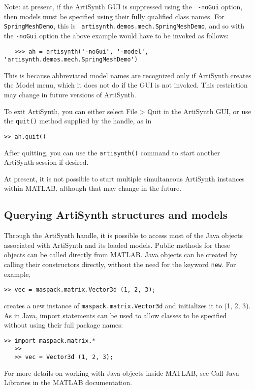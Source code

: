 \documentclass{article}
\begin{document}
%
\begin{sideblock}
Note: at present, if the ArtiSynth GUI is suppressed using the {\tt
-noGui} option, then models must be specified using their fully
qualified class names. For {\tt SpringMeshDemo}, this is {\tt
artisynth.demos.mech.SpringMeshDemo}, and so with the {\tt -noGui}
option the above example would have to be invoked as follows:
%
\begin{verbatim}
   >>> ah = artisynth('-noGui', '-model', 'artisynth.demos.mech.SpringMeshDemo')
\end{verbatim}
%
This is because abbreviated model names are recognized only if
ArtiSynth creates the {\sf Model} menu, which it does not do if the
GUI is not invoked. This restriction may change in future versions of
ArtiSynth.
\end{sideblock}
%

To exit ArtiSynth, you can either select {\sf File > Quit} in the
ArtiSynth GUI, or use the {\tt quit()} method supplied by the handle,
as in
%
\begin{lstlisting}[]
  >> ah.quit()
\end{lstlisting}
%

After quitting, you can use the {\tt artisynth()} command to start
another ArtiSynth session if desired.

\begin{sideblock}
At present, it is not possible to start multiple simultaneous
ArtiSynth instances within MATLAB, although that may change in the
future.
\end{sideblock}

\subsection{Querying ArtiSynth structures and models}
\label{MatlabQuerying:sec}

Through the ArtiSynth handle, it is possible to access most of the
Java objects associated with ArtiSynth and its loaded models.  Public
methods for these objects can be called directly from MATLAB. 
Java objects can be created by calling their constructors
directly, without the need for the keyword {\tt new}.
For example, 
%
\begin{lstlisting}[]
   >> vec = maspack.matrix.Vector3d (1, 2, 3);
\end{lstlisting}
%
creates a new instance of {\tt maspack.matrix.Vector3d} and
initializes it to (1, 2, 3). As in Java, import statements can be used
to allow classes to be specified without using their full package
names:
%
\begin{lstlisting}[]
   >> import maspack.matrix.*
   >>
   >> vec = Vector3d (1, 2, 3);
\end{lstlisting}
%
For more details on working with Java objects inside MATLAB, see {\sf
Call Java Libraries} in the MATLAB documentation.
\end{document}
